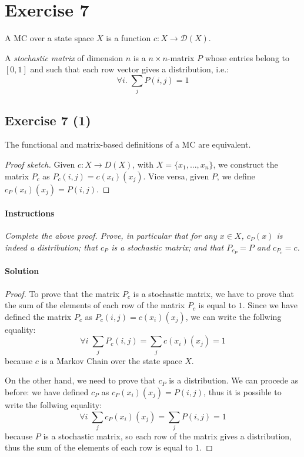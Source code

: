 \section*{Exercise 7}

\begin{definition} 
    \normalfont A MC over a state space $X$ is a function $ c: X \to \mathcal{D}(X) $.
\end{definition}
\begin{definition}
    \normalfont A \textit{stochastic matrix} of dimension $n$ is a $ n \times n$-matrix $P$ whose entries belong to $[0, 1]$ and
    such that each row vector gives a distribution, i.e.:
    \[ \forall i.\; \sum_{j} P(i, j) = 1 \]
\end{definition}

\subsection*{Exercise 7 (1)}
\begin{proposition}
    The functional and matrix-based definitions of a MC are equivalent.
\end{proposition}

\begin{proof}[Proof sketch]
    Given $ c : X \to  D(X) $, with $ X = \{x_{1}, . . . , x_{n}\} $, we construct the 
    matrix $ P_{c} $ as $ P_{c}(i, j) = c(x_{i})(x_{j}) $. 
    Vice versa, given $ P $, we define $ c_{P}(x_{i})(x_{j}) = P(i, j) $.
\end{proof}

\paragraph{Instructions} \textit{Complete the above proof. Prove, in particular that for any $ x \in X $, $ c_{P} (x) $ is indeed a 
distribution; that $ c_{P} $ is a stochastic matrix; and that $ P_{c_{P}} = P $ and $ c_{P_{c}} = c $.}

\paragraph{Solution}
\begin{proof}
    To prove that the matrix $P_{c}$ is a stochastic matrix, we have to prove that the sum of the elements of each row of the matrix
    $P_{c}$ is equal to $1$.
    Since we have defined the matrix $P_{c}$ as $ P_{c}(i, j) = c(x_{i})(x_{j}) $, we can write the follwing equality:
    \[ \forall i\;\sum_{j} P_{c}(i, j) = \sum_{j} c(x_{i})(x_{j}) = 1 \]
    because $c$ is a Markov Chain over the state space $X$.

   On the other hand, we need to prove that $c_{P}$ is a distribution. We can procede as before: we have defined $c_{P}$ as
   $ c_{P}(x_{i})(x_{j}) = P(i, j)$, thus it is possible to write the follwing equality:
   \[ \forall i\;\sum_{j} c_{P}(x_{i})(x_{j}) = \sum_{j} P(i, j) = 1 \]
   because $P$ is a stochastic matrix, so each row of the matrix gives a distribution, thus the sum of the elements of each row is
   equal to $1$.
\end{proof}


